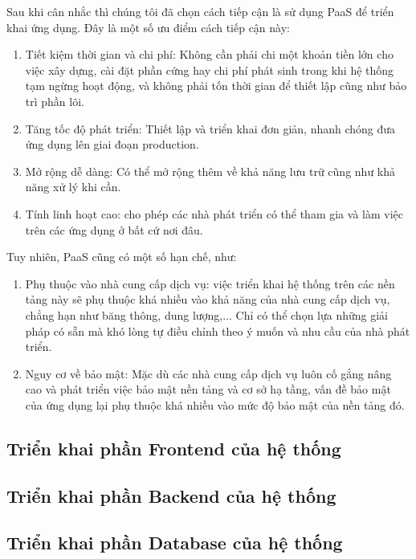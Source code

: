 Sau khi cân nhắc thì chúng tôi đã chọn cách tiếp cận là sử dụng PaaS để triển khai ứng dụng. Đây là một số ưu điểm cách tiếp cận này: 
\begin{enumerate}
    \item Tiết kiệm thời gian và chi phí: Không cần phải chi một khoản tiền lớn cho việc xây dựng, cài đặt phần cứng hay chi phí phát sinh trong khi hệ thống tạm ngừng hoạt động, và không phải tốn thời gian để thiết lập cũng như bảo trì phần lõi.
    \item Tăng tốc độ phát triển: Thiết lập và triển khai đơn giản, nhanh chóng đưa ứng dụng lên giai đoạn production.
    \item Mở rộng dễ dàng: Có thể mở rộng thêm về khả năng lưu trữ cũng như khả năng xử lý khi cần.
    \item Tính linh hoạt cao: cho phép các nhà phát triển có thể tham gia và làm việc trên các ứng dụng ở bất cứ nơi đâu.
\end{enumerate}
Tuy nhiên, PaaS cũng có một số hạn chế, như:
\begin{enumerate}
    \item Phụ thuộc vào nhà cung cấp dịch vụ: việc triển khai hệ thống trên các nền tảng này sẽ phụ thuộc khá nhiều vào khả năng của nhà cung cấp dịch vụ, chẳng hạn như băng thông, dung lượng,... Chỉ có thể chọn lựa những giải pháp có sẵn mà khó lòng tự điều chỉnh theo ý muốn và nhu cầu của nhà phát triển.
    \item Nguy cơ về bảo mật: Mặc dù các nhà cung cấp dịch vụ luôn cố gắng nâng cao và phát triển việc bảo mật nền tảng và cơ sở hạ tầng, vấn đề bảo mật của ứng dụng lại phụ thuộc khá nhiều vào mức độ bảo mật của nền tảng đó.
\end{enumerate}

\subsection{Triển khai phần Frontend của hệ thống}
\subsection{Triển khai phần Backend của hệ thống}

\subsection{Triển khai phần Database của hệ thống}

